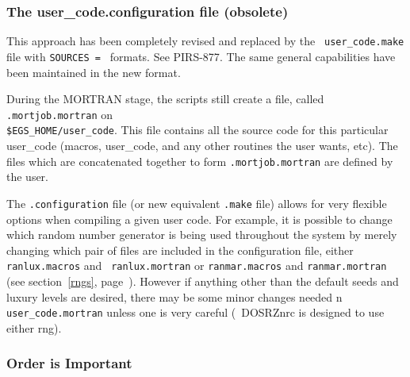 \subsubsection{The  user\_code.configuration file (obsolete)}
This approach has been completely revised and replaced by the {\tt
user\_code.make} file with {\tt SOURCES = } formats. See
PIRS-877\cite{Ka03}.  The same general capabilities have been maintained
in the new format.

During the MORTRAN stage, the scripts still create a file, called
\verb+.mortjob.mortran+ on \\
\verb+$EGS_HOME/user_code+. This file
contains all the source code for this
particular user\_code (macros, user\_code, and
any other routines the user wants, etc).
The files which are concatenated together to
form \verb+.mortjob.mortran+ are defined by the user.
% 
% 



The {\tt .configuration} file (or new equivalent {\tt .make} file) allows for
very flexible options when compiling a given user
code.  For example, it is possible to change which random number generator
is being used throughout the system by merely changing which pair of files
are included in the configuration file, either {\tt ranlux.macros} and {\tt
ranlux.mortran} or {\tt ranmar.macros} and {\tt ranmar.mortran} (see
section~\ref{rngs}, page~\pageref{rngs}). However if
anything other than the default seeds and luxury levels are desired, there
may be some minor changes needed n {\tt user\_code.mortran}
unless one is very careful (\eg\ DOSRZnrc is designed to use either rng).
 

\subsubsection{Order is Important}

